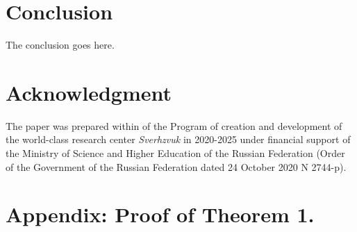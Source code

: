 \documentclass[journal,twocolumn]{IEEEtran}
\begin{document}
\section{Conclusion}

The conclusion goes here.






\section*{Acknowledgment}

The paper was prepared within of the Program of creation and development of the world-class research center \textit{Sverhzvuk} in 2020-2025 under financial support of the Ministry of Science and Higher Education of the Russian Federation (Order of the Government of the Russian Federation dated 24 October 2020 N 2744-p).


\ifCLASSOPTIONcaptionsoff
  \newpage
\fi

\section*{Appendix: Proof of Theorem 1. }






%
%
%
\end{document}
